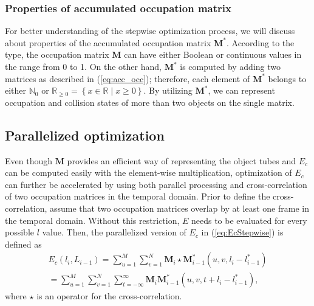 \documentclass[11pt]{hyu_thesis}
\begin{document}
\subsubsection{Properties of accumulated occupation matrix}
For better understanding of the stepwise optimization process, we will discuss about properties of the accumulated occupation matrix $\textbf{M}^{*}$. According to the type, the occupation matrix $\textbf{M}$ can have either Boolean or continuous values in the range from 0 to 1. On the other hand, $\textbf{M}^{*}$ is computed by adding two matrices as described in (\ref{eq:acc_occ}); therefore, each element of $\textbf{M}^{*}$ belongs to either $\mathbb{N}_{0}$ or $\mathbb{R}_{\geq 0}=\left\{ x \in \mathbb{R} \mid x \geq 0  \right\}$. By utilizing $\textbf{M}^{*}$, we can represent occupation and collision states of more than two objects on the single matrix.

\subsection{Parallelized optimization}
Even though $\textbf{M}$ provides an efficient way of representing the object tubes and $E_c$ can be computed easily with the element-wise multiplication, optimization of $E_c$ can further be accelerated by using both parallel processing and cross-correlation of two occupation matrices in the temporal domain. Prior to define the cross-correlation, assume that two occupation matrices overlap by at least one frame in the temporal domain. Without this restriction, $E$ needs to be evaluated for every possible $l$ value. Then, the parallelized version of $E_c$ in (\ref{eq:EcStepwise}) is defined as
\begin{equation}
\label{eq:EcPP}
\begin{aligned}
E_c(l_i, L_{i-1}) = \sum_{u=1}^{M} \sum_{v=1}^{N} \textbf{M}_{i} \star \textbf{M}_{i-1}^{*}(u, v, l_i - l_{i-1}^{*}) \\
= \sum_{u=1}^{M} \sum_{v=1}^{N} \sum_{t=-\infty}^{\infty} \textbf{M}_{i}\textbf{M}_{i-1}^{*}(u, v, t + l_i - l_{i-1}^{*}),
\end{aligned}
\end{equation}
where $\star$ is an operator for the cross-correlation.
\end{document}

